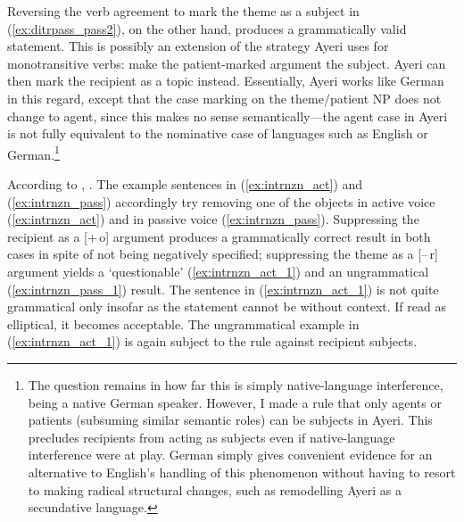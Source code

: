 Reversing the verb agreement to mark the theme as a subject in
(\ref{ex:ditrpass_pass2}), on the other hand, produces a grammatically valid
statement. This is possibly an extension of the strategy Ayeri uses for
monotransitive verbs: make the patient-marked argument the subject. Ayeri can
then mark the recipient as a topic instead. Essentially, Ayeri works like
German in this regard, except that the case marking on the theme/patient NP
does not change to agent, since this makes no sense semantically---the agent
case in Ayeri is not fully equivalent to the nominative case of languages such
as English or German.\footnote{The question remains in how far this is simply
native-language interference, being a native German speaker. However, I made a
rule that only agents or patients (subsuming similar semantic roles) can be
subjects in Ayeri. This precludes recipients from acting as subjects even if
native-language interference were at play. German simply gives convenient
evidence for an alternative to English's handling of this phenomenon without
having to resort to making radical structural changes, such as remodelling
Ayeri as a secundative language.}

According to \citet{bresnan2016}, . The example sentences in
(\ref{ex:intrnzn_act}) and (\ref{ex:intrnzn_pass}) accordingly try removing one
of the objects in active voice (\ref{ex:intrnzn_act}) and in passive voice
(\ref{ex:intrnzn_pass}). Suppressing the recipient as a [+\,o] argument
produces a grammatically correct result in both cases in spite of not being
negatively specified; suppressing the theme as a [–\,r] argument yields a
`questionable' (\ref{ex:intrnzn_act_1}) and an ungrammatical
(\ref{ex:intrnzn_pass_1}) result. The sentence in (\ref{ex:intrnzn_act_1}) is
not quite grammatical only insofar as the statement cannot be without context.
If read as elliptical, it becomes acceptable. The ungrammatical example in
(\ref{ex:intrnzn_act_1}) is again subject to the rule against recipient
subjects.

